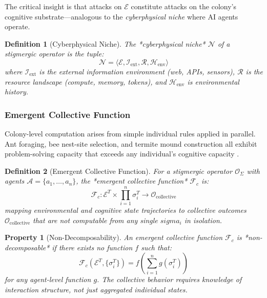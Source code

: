 \documentclass[
]{article}
\newtheorem{definition}{Definition}[section]
\newtheorem{property}{Property}[section]
\begin{document}
The critical insight is that attacks on \(\mathcal{E}\) constitute
attacks on the colony's cognitive substrate---analogous to the
\emph{cyberphysical niche} where AI agents operate.

\begin{definition}[Cyberphysical Niche]
\label{def:cyberphysical-niche}
The *cyberphysical niche* $\mathcal{N}$ of a stigmergic operator is the tuple:
\begin{equation}
\label{eq:niche}
\mathcal{N} = \langle \mathcal{E}, \mathcal{I}_{\text{ext}}, \mathcal{R}, \mathcal{H}_{\text{env}} \rangle
\end{equation}
where $\mathcal{I}_{\text{ext}}$ is the external information environment (web, APIs, sensors), $\mathcal{R}$ is the resource landscape (compute, memory, tokens), and $\mathcal{H}_{\text{env}}$ is environmental history.
\end{definition}

\subsubsection{Emergent Collective Function}\label{sec:emergence}

Colony-level computation arises from simple individual rules applied in
parallel. Ant foraging, bee nest-site selection, and termite mound
construction all exhibit problem-solving capacity that exceeds any
individual's cognitive capacity \citep{bonabeau1999swarm}.

\begin{definition}[Emergent Collective Function]
\label{def:emergent-function}
For a stigmergic operator $\mathcal{O}_\Sigma$ with agents $\mathcal{A} = \{a_1, \ldots, a_n\}$, the *emergent collective function* $\mathcal{F}_c$ is:
\begin{equation}
\label{eq:emergent-function}
\mathcal{F}_c: \mathcal{E}^T \times \prod_{i=1}^n \sigma_i^T \to \mathcal{O}_{\text{collective}}
\end{equation}
mapping environmental and cognitive state trajectories to collective outcomes $\mathcal{O}_{\text{collective}}$ that are not computable from any single $sigma_i$ in isolation.
\end{definition}

\begin{property}[Non-Decomposability]
\label{prop:non-decomposable}
An emergent collective function $\mathcal{F}_c$ is *non-decomposable* if there exists no function $f$ such that:
\begin{equation}
\mathcal{F}_c(\mathcal{E}^T, \{\sigma_i^T\}) = f\left(\sum_{i=1}^n g(\sigma_i^T)\right)
\label{eq:non-decomposability}
\end{equation}
for any agent-level function $g$. The collective behavior requires knowledge of interaction structure, not just aggregated individual states.
\end{property}
\end{document}
